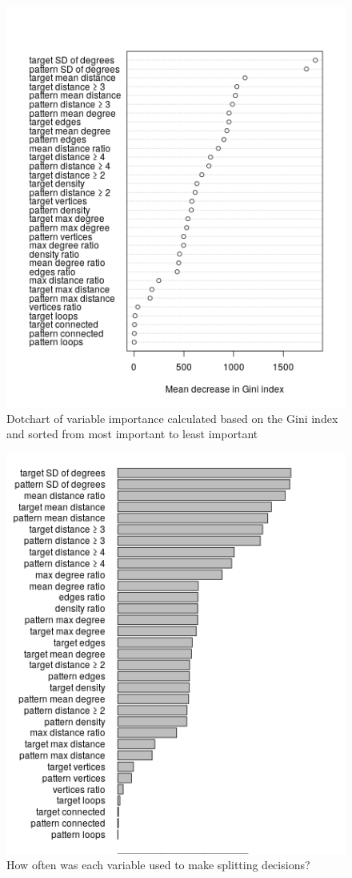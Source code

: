 \documentclass{l4proj}
\theoremstyle{definition}
\theoremstyle{remark}
\begin{document}
\begin{figure}
  \centering
  \includegraphics{images/unlabelled_variable_importance.png}
  \caption{Dotchart of variable importance calculated based on the Gini index
    and sorted from most important to least important}
  \label{fig:unlabelled_variable_importance}
\end{figure}

\begin{figure}
  \centering
  \includegraphics{images/unlabelled_var_used.png}
  \caption{How often was each variable used to make splitting decisions?}
  \label{fig:unlabelled_var_used}
\end{figure}
\end{document}
